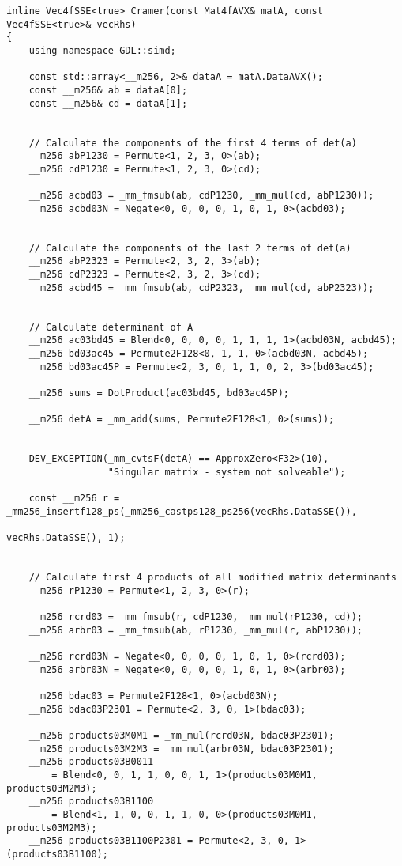 \begin{verbatim}
inline Vec4fSSE<true> Cramer(const Mat4fAVX& matA, const Vec4fSSE<true>& vecRhs)
{
    using namespace GDL::simd;

    const std::array<__m256, 2>& dataA = matA.DataAVX();
    const __m256& ab = dataA[0];
    const __m256& cd = dataA[1];


    // Calculate the components of the first 4 terms of det(a)
    __m256 abP1230 = Permute<1, 2, 3, 0>(ab);
    __m256 cdP1230 = Permute<1, 2, 3, 0>(cd);

    __m256 acbd03 = _mm_fmsub(ab, cdP1230, _mm_mul(cd, abP1230));
    __m256 acbd03N = Negate<0, 0, 0, 0, 1, 0, 1, 0>(acbd03);


    // Calculate the components of the last 2 terms of det(a)
    __m256 abP2323 = Permute<2, 3, 2, 3>(ab);
    __m256 cdP2323 = Permute<2, 3, 2, 3>(cd);
    __m256 acbd45 = _mm_fmsub(ab, cdP2323, _mm_mul(cd, abP2323));


    // Calculate determinant of A
    __m256 ac03bd45 = Blend<0, 0, 0, 0, 1, 1, 1, 1>(acbd03N, acbd45);
    __m256 bd03ac45 = Permute2F128<0, 1, 1, 0>(acbd03N, acbd45);
    __m256 bd03ac45P = Permute<2, 3, 0, 1, 1, 0, 2, 3>(bd03ac45);

    __m256 sums = DotProduct(ac03bd45, bd03ac45P);

    __m256 detA = _mm_add(sums, Permute2F128<1, 0>(sums));


    DEV_EXCEPTION(_mm_cvtsF(detA) == ApproxZero<F32>(10), 
                  "Singular matrix - system not solveable");

    const __m256 r = _mm256_insertf128_ps(_mm256_castps128_ps256(vecRhs.DataSSE()), 
                                                                 vecRhs.DataSSE(), 1);


    // Calculate first 4 products of all modified matrix determinants
    __m256 rP1230 = Permute<1, 2, 3, 0>(r);

    __m256 rcrd03 = _mm_fmsub(r, cdP1230, _mm_mul(rP1230, cd));
    __m256 arbr03 = _mm_fmsub(ab, rP1230, _mm_mul(r, abP1230));

    __m256 rcrd03N = Negate<0, 0, 0, 0, 1, 0, 1, 0>(rcrd03);
    __m256 arbr03N = Negate<0, 0, 0, 0, 1, 0, 1, 0>(arbr03);

    __m256 bdac03 = Permute2F128<1, 0>(acbd03N);
    __m256 bdac03P2301 = Permute<2, 3, 0, 1>(bdac03);

    __m256 products03M0M1 = _mm_mul(rcrd03N, bdac03P2301);
    __m256 products03M2M3 = _mm_mul(arbr03N, bdac03P2301);
    __m256 products03B0011 
        = Blend<0, 0, 1, 1, 0, 0, 1, 1>(products03M0M1, products03M2M3);
    __m256 products03B1100 
        = Blend<1, 1, 0, 0, 1, 1, 0, 0>(products03M0M1, products03M2M3);
    __m256 products03B1100P2301 = Permute<2, 3, 0, 1>(products03B1100);


\end{verbatim}
